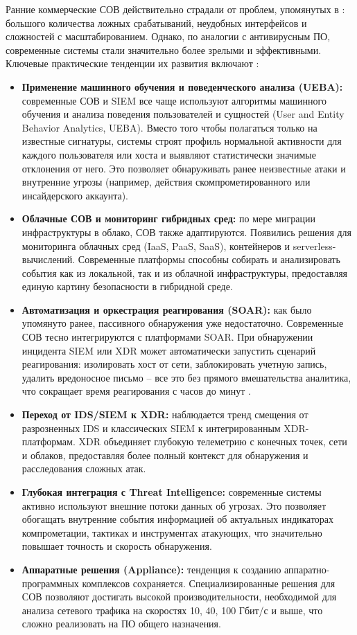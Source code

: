 Ранние коммерческие СОВ действительно страдали от проблем, упомянутых в \autocite{IDSClassification}: большого количества ложных срабатываний, неудобных интерфейсов и сложностей с масштабированием. Однако, по аналогии с антивирусным ПО, современные системы стали значительно более зрелыми и эффективными. Ключевые практические тенденции их развития включают \cite{IDSBranitsky}:

\begin{itemize}
    \item \textbf{Применение машинного обучения и поведенческого анализа (UEBA):} современные СОВ и SIEM все чаще используют алгоритмы машинного обучения и анализа поведения пользователей и сущностей (User and Entity Behavior Analytics, UEBA). Вместо того чтобы полагаться только на известные сигнатуры, системы строят профиль нормальной активности для каждого пользователя или хоста и выявляют статистически значимые отклонения от него. Это позволяет обнаруживать ранее неизвестные атаки и внутренние угрозы (например, действия скомпрометированного или инсайдерского аккаунта).
    \item \textbf{Облачные СОВ и мониторинг гибридных сред:} по мере миграции инфраструктуры в облако, СОВ также адаптируются. Появились решения для мониторинга облачных сред (IaaS, PaaS, SaaS), контейнеров и serverless-вычислений. Современные платформы способны собирать и анализировать события как из локальной, так и из облачной инфраструктуры, предоставляя единую картину безопасности в гибридной среде.
    \item \textbf{Автоматизация и оркестрация реагирования (SOAR):} как было упомянуто ранее, пассивного обнаружения уже недостаточно. Современные СОВ тесно интегрируются с платформами SOAR. При обнаружении инцидента SIEM или XDR может автоматически запустить сценарий реагирования: изолировать хост от сети, заблокировать учетную запись, удалить вредоносное письмо -- все это без прямого вмешательства аналитика, что сокращает время реагирования с часов до минут \cite{SIEMSec}.
    \item \textbf{Переход от IDS/SIEM к XDR:} наблюдается тренд смещения от разрозненных IDS и классических SIEM к интегрированным XDR-платформам. XDR объединяет глубокую телеметрию с конечных точек, сети и облаков, предоставляя более полный контекст для обнаружения и расследования сложных атак.
    \item \textbf{Глубокая интеграция с Threat Intelligence:} современные системы активно используют внешние потоки данных об угрозах. Это позволяет обогащать внутренние события информацией об актуальных индикаторах компрометации, тактиках и инструментах атакующих, что значительно повышает точность и скорость обнаружения.
    \item \textbf{Аппаратные решения (Appliance):} тенденция к созданию аппаратно-программных комплексов сохраняется. Специализированные решения для СОВ позволяют достигать высокой производительности, необходимой для анализа сетевого трафика на скоростях 10, 40, 100 Гбит/с и выше, что сложно реализовать на ПО общего назначения.
\end{itemize}

